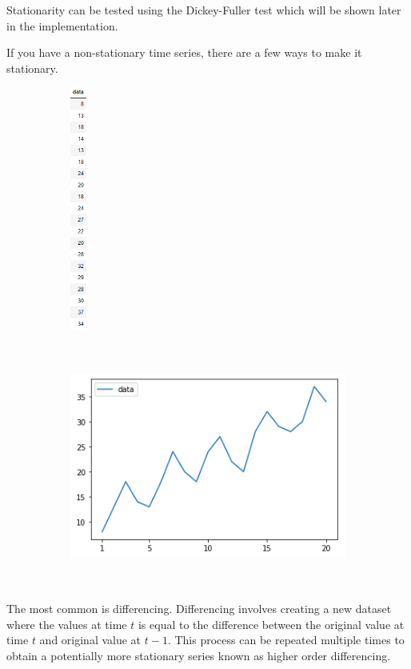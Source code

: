 \documentclass{article}
\begin{document}
  \begin{flushleft}
    Stationarity can be tested using the Dickey-Fuller test which will be shown later in the implementation.

    If you have a non-stationary time series, there are a few ways to make it stationary.
    \begin{figure}[H]
      \centering
      \begin{subfigure}[b]{0.2\linewidth}
        \includegraphics[height=80mm]{data_numbers.png}
      \end{subfigure}
      \begin{subfigure}[b]{0.7\linewidth}
        \includegraphics[height=80mm, width=120mm]{data_plot.png}
      \end{subfigure}
    \end{figure}
    \newpage
    The most common is differencing. Differencing involves creating a new dataset where the values at time $t$ is equal to the difference between the original value at time $t$ and original value at $t-1$. This process can be repeated multiple times to obtain a potentially more stationary series known as higher order differencing.

\end{flushleft}
\end{document}
